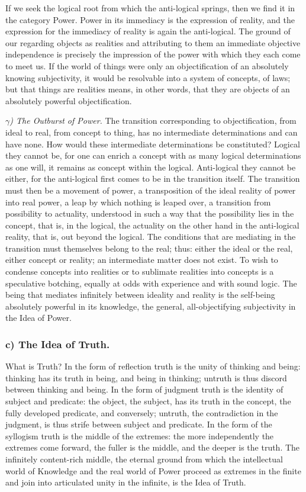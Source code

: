 \documentclass[12pt]{book}
\begin{document}
If we seek the logical root from which the anti-logical springs, then we find it
in the category Power. Power in its immediacy is the expression of reality, and
the expression for the immediacy of reality is again the anti-logical. The ground
of our regarding objects as realities and attributing to them an immediate
objective independence is precisely the impression of the power with which they
each come to meet us. If the world of things were only an objectification of an
absolutely knowing subjectivity, it would be resolvable into a system of concepts,
of laws; but that things are realities means, in other words, that they are
objects of an absolutely powerful objectification.

\emph{$\gamma$) The Outburst of Power.} The transition corresponding to
objectification, from ideal to real, from concept to thing, has no intermediate
determinations and can have none. How would these intermediate determinations be
constituted? Logical they cannot be, for one can enrich a concept with as many
logical determinations as one will, it remains as concept within the logical.
Anti-logical they cannot be either, for the anti-logical first comes to be in the
transition itself. The transition must then be a movement of power, a transposition
of the ideal reality of power into real power, a leap by which nothing is leaped
over, a transition from possibility to actuality, understood in such a way that the
possibility lies in the concept, that is, in the logical, the actuality on the
other hand in the anti-logical reality, that is, out beyond the logical. The
conditions that are mediating in the transition must themselves belong to the
real; thus: either the ideal or the real, either concept or reality; an
intermediate matter does not exist. To wish to condense concepts into realities or
to sublimate realities into concepts is a speculative botching, equally at odds
with experience and with sound logic. The being that mediates infinitely between
ideality and reality is the self-being absolutely powerful in its knowledge, the
general, all-objectifying subjectivity in the Idea of Power.

\subsubsection*{c) The Idea of Truth.} What is Truth? In the form of reflection
truth is the unity of thinking and being: thinking has its truth in being, and
being in thinking; untruth is thus discord between thinking and being. In the form
of judgment truth is the identity of subject and predicate: the object, the
subject, has its truth in the concept, the fully developed predicate, and
conversely; untruth, the contradiction in the judgment, is thus strife between
subject and predicate. In the form of the syllogism truth is the middle of the
extremes: the more independently the extremes come forward, the fuller is the
middle, and the deeper is the truth. The infinitely content-rich middle, the
eternal ground from which the intellectual world of Knowledge and the real world
of Power proceed as extremes in the finite and join into articulated unity in the
infinite, is the Idea of Truth.
\end{document}
